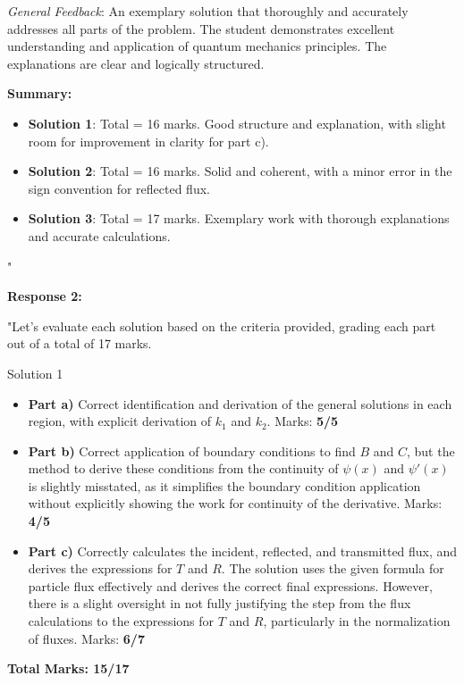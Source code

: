 \documentclass[a4paper,11pt]{article}
\begin{document}
\textit{General Feedback}: An exemplary solution that thoroughly and accurately addresses all parts of the problem. The student demonstrates excellent understanding and application of quantum mechanics principles. The explanations are clear and logically structured.

\textbf{Summary:}

\begin{itemize}
    \item \textbf{Solution 1}: Total = 16 marks. Good structure and explanation, with slight room for improvement in clarity for part c).
    \item \textbf{Solution 2}: Total = 16 marks. Solid and coherent, with a minor error in the sign convention for reflected flux.
    \item \textbf{Solution 3}: Total = 17 marks. Exemplary work with thorough explanations and accurate calculations.
\end{itemize}
"

\textbf{Response 2:}

"Let's evaluate each solution based on the criteria provided, grading each part out of a total of 17 marks.

Solution 1

\begin{itemize}
    \item \textbf{Part a)} Correct identification and derivation of the general solutions in each region, with explicit derivation of \(k_1\) and \(k_2\). Marks: \textbf{5/5}
    \item \textbf{Part b)} Correct application of boundary conditions to find \(B\) and \(C\), but the method to derive these conditions from the continuity of \(\psi(x)\) and \(\psi'(x)\) is slightly misstated, as it simplifies the boundary condition application without explicitly showing the work for continuity of the derivative. Marks: \textbf{4/5}
    \item \textbf{Part c)} Correctly calculates the incident, reflected, and transmitted flux, and derives the expressions for \(T\) and \(R\). The solution uses the given formula for particle flux effectively and derives the correct final expressions. However, there is a slight oversight in not fully justifying the step from the flux calculations to the expressions for \(T\) and \(R\), particularly in the normalization of fluxes. Marks: \textbf{6/7}
\end{itemize}

\textbf{Total Marks: 15/17}
\end{document}
